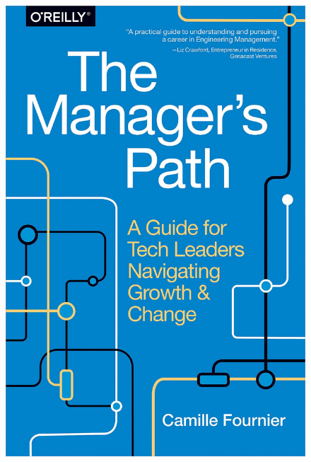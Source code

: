 \documentclass[aspectratio=169,xcolor=x11names,table]{beamer}
\begin{document}
\begin{frame}
\begin{columns}
\begin{column}{0.3\linewidth}
\begin{figure}
				\includegraphics[width=\columnwidth]{manager}
			\end{figure}
		\end{column}
	\end{columns}
\end{frame}
\end{document}

